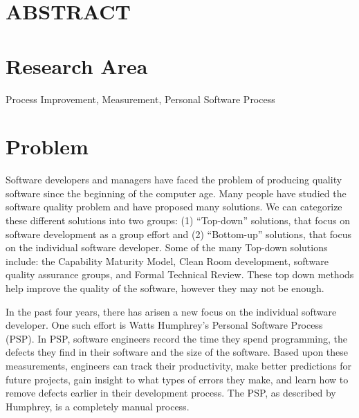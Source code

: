 \thispagestyle{empty}  %




\section*{ABSTRACT}

\section*{Research Area}
Process Improvement, Measurement, Personal Software Process
\section*{Problem}

Software developers and managers have faced the problem of producing
quality software since the beginning of the computer age.  Many people have
studied the software quality problem and have proposed many solutions.  We
can categorize these different solutions into two groups: (1) ``Top-down''
solutions, that focus on software development as a group effort and (2)
``Bottom-up'' solutions, that focus on the individual software developer.  Some
of the many Top-down solutions include: the Capability Maturity Model,
Clean Room development, software quality assurance groups, and Formal
Technical Review.  These top down methods help improve the quality of the
software, however they may not be enough.

In the past four years, there has arisen a new focus on the individual
software developer.  One such effort is Watts Humphrey's Personal Software
Process (PSP)\cite{Humphrey95}.  In PSP, software engineers record the time
they spend programming, the defects they find in their software and the
size of the software.  Based upon these measurements, engineers can
track their productivity, make better predictions for future projects, gain
insight to what types of errors they make, and learn how to remove defects
earlier in their development process.  The PSP, as described by Humphrey,
is a completely manual process.

